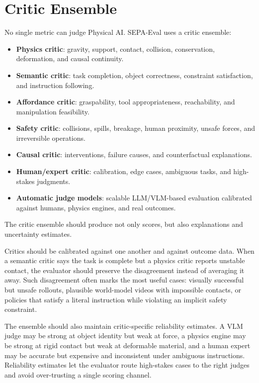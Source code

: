 \documentclass[sigconf,review,anonymous]{acmart}
\newcommand{\system}{SEPA-Eval\xspace}
\begin{document}
\section{Critic Ensemble}

No single metric can judge Physical AI. \system uses a critic ensemble:

\begin{itemize}[leftmargin=*]
  \item \textbf{Physics critic}: gravity, support, contact, collision, conservation, deformation, and causal continuity.
  \item \textbf{Semantic critic}: task completion, object correctness, constraint satisfaction, and instruction following.
  \item \textbf{Affordance critic}: graspability, tool appropriateness, reachability, and manipulation feasibility.
  \item \textbf{Safety critic}: collisions, spills, breakage, human proximity, unsafe forces, and irreversible operations.
  \item \textbf{Causal critic}: interventions, failure causes, and counterfactual explanations.
  \item \textbf{Human/expert critic}: calibration, edge cases, ambiguous tasks, and high-stakes judgments.
  \item \textbf{Automatic judge models}: scalable LLM/VLM-based evaluation calibrated against humans, physics engines, and real outcomes.
\end{itemize}

The critic ensemble should produce not only scores, but also explanations and uncertainty estimates.

Critics should be calibrated against one another and against outcome data. When a semantic critic says the task is complete but a physics critic reports unstable contact, the evaluator should preserve the disagreement instead of averaging it away. Such disagreement often marks the most useful cases: visually successful but unsafe rollouts, plausible world-model videos with impossible contacts, or policies that satisfy a literal instruction while violating an implicit safety constraint.

The ensemble should also maintain critic-specific reliability estimates. A VLM judge may be strong at object identity but weak at force, a physics engine may be strong at rigid contact but weak at deformable material, and a human expert may be accurate but expensive and inconsistent under ambiguous instructions. Reliability estimates let the evaluator route high-stakes cases to the right judges and avoid over-trusting a single scoring channel.
\end{document}
